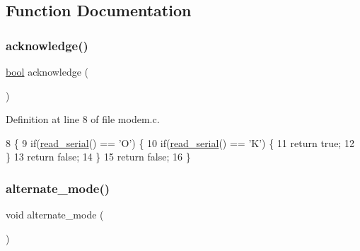 \subsection{Function Documentation}
\mbox{\label{a00044_a8529dba543149138317e327931bf5a5c_a8529dba543149138317e327931bf5a5c}} 
\subsubsection{\texorpdfstring{acknowledge()}{acknowledge()}}
{\footnotesize\ttfamily \hyperlink{a00140_af6a258d8f3ee5206d682d799316314b1_af6a258d8f3ee5206d682d799316314b1}{bool} acknowledge (\begin{DoxyParamCaption}{ }\end{DoxyParamCaption})}



Definition at line 8 of file modem.\+c.


\begin{DoxyCode}
8                    \{
9     \textcolor{keywordflow}{if}(\hyperlink{a00056_ad343a7018f74662f794968dfa0523841_ad343a7018f74662f794968dfa0523841}{read\_serial}() == \textcolor{charliteral}{'O'}) \{
10         \textcolor{keywordflow}{if}(\hyperlink{a00056_ad343a7018f74662f794968dfa0523841_ad343a7018f74662f794968dfa0523841}{read\_serial}() == \textcolor{charliteral}{'K'}) \{
11             \textcolor{keywordflow}{return} \textcolor{keyword}{true};
12         \}
13         \textcolor{keywordflow}{return} \textcolor{keyword}{false};
14     \}
15     \textcolor{keywordflow}{return} \textcolor{keyword}{false};
16 \}
\end{DoxyCode}
\mbox{\label{a00044_ace378eaa88c0b7f0cdafe97d064e36fb_ace378eaa88c0b7f0cdafe97d064e36fb}} 
\subsubsection{\texorpdfstring{alternate\+\_\+mode()}{alternate\_mode()}}
{\footnotesize\ttfamily void alternate\+\_\+mode (\begin{DoxyParamCaption}{ }\end{DoxyParamCaption})}



